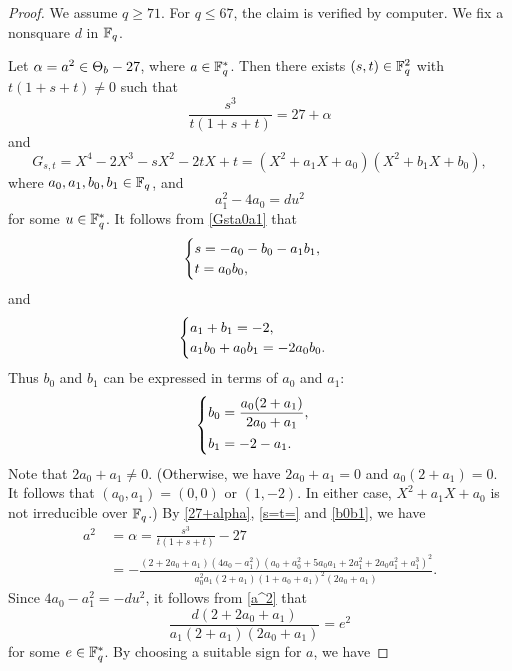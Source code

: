 \documentclass[10pt,a4paper]{amsart}
\newcommand{\f}{\Bbb F}
\begin{document}
\begin{proof}
We assume $q\ge 71$. For $q\le 67$, the claim is verified by computer. We fix a nonsquare $d$ in $\f_q$.

\medskip
Let $\alpha=a^2\in\Theta_{\rm b}-27$, where $a\in\f_q^*$. Then there exists $(s,t)\in\f_q^2$ with $t(1+s+t)\ne 0$ such that
\begin{equation}\label{27+alpha}
\frac{s^3}{t(1+s+t)}=27+\alpha
\end{equation}
and
\begin{equation}\label{Gsta0a1}
G_{s,t}=X^4-2X^3-sX^2-2tX+t=(X^2+a_1X+a_0)(X^2+b_1X+b_0),
\end{equation}
where $a_0,a_1,b_0,b_1\in\f_q$, and
\begin{equation}\label{du2}
a_1^2-4a_0=du^2
\end{equation}
for some $u\in\f_q^*$. It follows from \eqref{Gsta0a1} that
\begin{equation}\label{s=t=}
\begin{cases}
s=-a_0-b_0-a_1b_1,\cr
t=a_0b_0,
\end{cases}
\end{equation}
and
\[
\begin{cases}
a_1+b_1=-2,\cr
a_1b_0+a_0b_1=-2a_0b_0.
\end{cases}
\]
Thus $b_0$ and $b_1$ can be expressed in terms of $a_0$ and $a_1$:
\begin{equation}\label{b0b1}
\begin{cases}
b_0=\displaystyle\frac{a_0(2+a_1)}{2a_0+a_1},\vspace{0.4em}\cr
b_1=-2-a_1.
\end{cases}
\end{equation}
Note that $2a_0+a_1\ne 0$. (Otherwise, we have $2a_0+a_1=0$ and $a_0(2+a_1)=0$. It follows that $(a_0,a_1)=(0,0)$ or $(1,-2)$. In either case, $X^2+a_1X+a_0$ is not irreducible over $\f_q$.)
By \eqref{27+alpha}, \eqref{s=t=} and \eqref{b0b1}, we have
\begin{align}\label{a^2}
a^2\,&=\alpha=\frac{s^3}{t(1+s+t)}-27\\
&=-\frac{(2+2 a_0+a_1) (4 a_0-a_1^2) (a_0+a_0^2+5 a_0 a_1+2 a_1^2+2 a_0 a_1^2+a_1^3)^2}{a_0^2 a_1 (2+a_1) (1+a_0+a_1)^2 (2 a_0+a_1)}. \nonumber
\end{align}
Since $4a_0-a_1^2=-du^2$, it follows from \eqref{a^2} that 
\begin{equation}\label{cod2}
\frac{d(2+2 a_0+a_1)}{a_1 (2+a_1)(2 a_0+a_1)}=e^2
\end{equation}
for some $e\in\f_q^*$. By choosing a suitable sign for $a$, we have

\end{proof}
\end{document}
